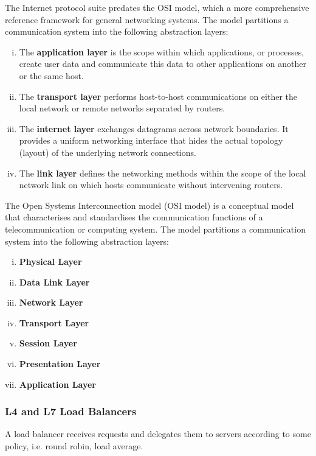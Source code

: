 \documentclass{article}
\begin{document}
    The Internet protocol suite predates the OSI model, which a more comprehensive reference framework for general networking systems. The model partitions a communication system into the following abstraction layers:
    \begin{enumerate}[i.]
        \item The \textbf{application layer} is the scope within which applications, or processes, create user data and communicate this data to other applications on another or the same host.
        \item The \textbf{transport layer} performs host-to-host communications on either the local network or remote networks separated by routers.
        \item The \textbf{internet layer} exchanges datagrams across network boundaries. It provides a uniform networking interface that hides the actual topology (layout) of the underlying network connections.
        \item The \textbf{link layer} defines the networking methods within the scope of the local network link on which hosts communicate without intervening routers.
    \end{enumerate}
    
    The Open Systems Interconnection model (OSI model) is a conceptual model that characterises and standardises the communication functions of a telecommunication or computing system. The model partitions a communication system into the following abstraction layers:

    \begin{multicols}{2}
    \begin{enumerate}[i.]
        \item \textbf{Physical Layer}
        \item \textbf{Data Link Layer}
        \item \textbf{Network Layer}
        \item \textbf{Transport Layer}
        \item \textbf{Session Layer}
        \item \textbf{Presentation Layer}
        \item \textbf{Application Layer}
    \end{enumerate}
    \end{multicols}
    
    \subsubsection{L4 and L7 Load Balancers}
    A load balancer receives requests and delegates them to servers according to some policy, i.e. round robin, load average.
    
\end{document}
